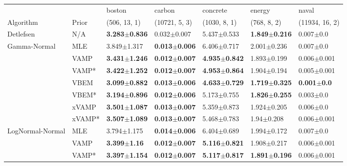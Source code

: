 \begin{tabular}{lllllll}
\toprule
                 &        &                    boston &                    carbon &                  concrete &                    energy &                   naval \\
Algorithm & Prior& (506, 13, 1)& (10721, 5, 3)& (1030, 8, 1)& (768, 8, 2)& (11934, 16, 2)\\
\midrule
Detlefsen & N/A &  \textbf{3.283$\pm$0.836} &           0.032$\pm$0.007 &           5.437$\pm$0.533 &  \textbf{1.849$\pm$0.216} &           0.007$\pm$0.0 \\
Gamma-Normal & MLE &           3.849$\pm$1.317 &  \textbf{0.013$\pm$0.006} &           6.406$\pm$0.717 &           2.001$\pm$0.236 &           0.007$\pm$0.0 \\
                 & VAMP &  \textbf{3.431$\pm$1.246} &  \textbf{0.012$\pm$0.007} &  \textbf{4.935$\pm$0.842} &           1.893$\pm$0.199 &         0.006$\pm$0.001 \\
                 & VAMP* &  \textbf{3.422$\pm$1.252} &  \textbf{0.012$\pm$0.007} &  \textbf{4.953$\pm$0.864} &           1.904$\pm$0.194 &         0.005$\pm$0.001 \\
                 & VBEM &  \textbf{3.099$\pm$0.882} &  \textbf{0.013$\pm$0.006} &  \textbf{4.633$\pm$0.729} &  \textbf{1.719$\pm$0.325} &  \textbf{0.001$\pm$0.0} \\
                 & VBEM* &  \textbf{3.194$\pm$0.896} &  \textbf{0.012$\pm$0.006} &           5.173$\pm$0.755 &  \textbf{1.826$\pm$0.255} &           0.003$\pm$0.0 \\
                 & xVAMP &  \textbf{3.501$\pm$1.087} &  \textbf{0.013$\pm$0.007} &           5.359$\pm$0.873 &           1.924$\pm$0.205 &           0.006$\pm$0.0 \\
                 & xVAMP* &  \textbf{3.507$\pm$1.089} &  \textbf{0.013$\pm$0.007} &           5.468$\pm$0.783 &            1.94$\pm$0.208 &         0.006$\pm$0.001 \\
LogNormal-Normal & MLE &           3.794$\pm$1.175 &  \textbf{0.014$\pm$0.006} &           6.404$\pm$0.689 &           1.994$\pm$0.172 &           0.007$\pm$0.0 \\
                 & VAMP &   \textbf{3.399$\pm$1.16} &  \textbf{0.012$\pm$0.007} &  \textbf{5.116$\pm$0.821} &           1.908$\pm$0.217 &         0.006$\pm$0.001 \\
                 & VAMP* &  \textbf{3.397$\pm$1.154} &  \textbf{0.012$\pm$0.007} &  \textbf{5.117$\pm$0.817} &  \textbf{1.891$\pm$0.196} &         0.006$\pm$0.001 \\

\end{tabular}
